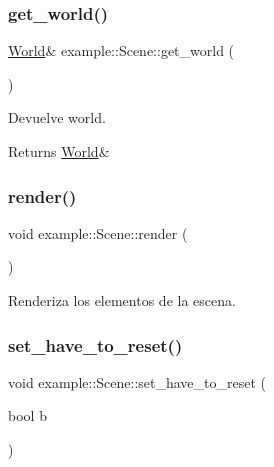 \subsubsection{\texorpdfstring{get\_world()}{get\_world()}}
{\footnotesize\ttfamily \mbox{\hyperlink{classexample_1_1_world}{World}}\& example\+::\+Scene\+::get\+\_\+world (\begin{DoxyParamCaption}{ }\end{DoxyParamCaption})\hspace{0.3cm}{\ttfamily [inline]}}



Devuelve world. 

\begin{DoxyReturn}{Returns}
\mbox{\hyperlink{classexample_1_1_world}{World}}\& 
\end{DoxyReturn}
\mbox{\label{classexample_1_1_scene_a6e8672b9fab7eaa38bc039467dc0b66a}} 
\subsubsection{\texorpdfstring{render()}{render()}}
{\footnotesize\ttfamily void example\+::\+Scene\+::render (\begin{DoxyParamCaption}{ }\end{DoxyParamCaption})}



Renderiza los elementos de la escena. 

\mbox{\label{classexample_1_1_scene_aef7c8aa7d2e11e950af439b8e5a45e1d}} 
\subsubsection{\texorpdfstring{set\_have\_to\_reset()}{set\_have\_to\_reset()}}
{\footnotesize\ttfamily void example\+::\+Scene\+::set\+\_\+have\+\_\+to\+\_\+reset (\begin{DoxyParamCaption}\item[{bool}]{b }\end{DoxyParamCaption})\hspace{0.3cm}{\ttfamily [inline]}}



